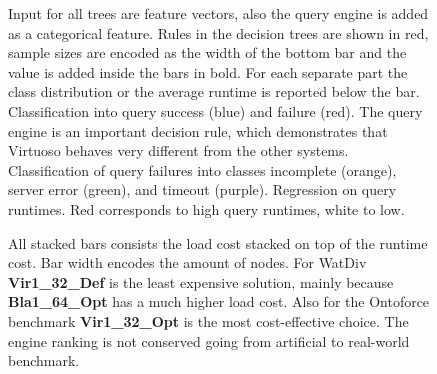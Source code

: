 \documentclass[twocolumn]{bmcart}%
\def\texttt{[image: ]}
\begin{document}
\begin{backmatter}
\begin{figure}[ht!]
	\centering
	\caption{ Input for all trees are feature vectors, also the query engine is added as a categorical feature. Rules in the decision trees are shown in red, sample sizes are encoded as the width of the bottom bar and the value is added inside the bars in bold. For each separate part the class distribution or the average runtime is reported below the bar. 
		\newline \hspace{\linewidth} 	
		\underline{} Classification into query success (blue) and failure (red). The query engine is an important decision rule, which demonstrates that Virtuoso behaves very different from the other systems.  
		\newline \hspace{\linewidth} 	
		\underline{} Classification of query failures into classes incomplete (orange), server error (green), and timeout (purple). 
		\newline \hspace{\linewidth} 	
		\underline{}  Regression on query runtimes. Red corresponds to high query runtimes, white to low. }
	\label{fig:Fig10_AllTrees}
\end{figure}

\begin{figure}[ht!]
	\centering
	\caption{ All stacked bars consists the load cost stacked on top of the runtime cost. Bar width encodes the amount of nodes. For WatDiv \textbf{Vir1\_32\_Def} is the least expensive solution, mainly because \textbf{Bla1\_64\_Opt} has a much higher load cost. Also for the Ontoforce benchmark\textbf{ Vir1\_32\_Opt} is the most cost-effective choice. The engine ranking is not conserved going from artificial to real-world benchmark.}
	\label{fig:Fig11_AllSims_Correct}
\end{figure}



\end{backmatter}
\end{document}
